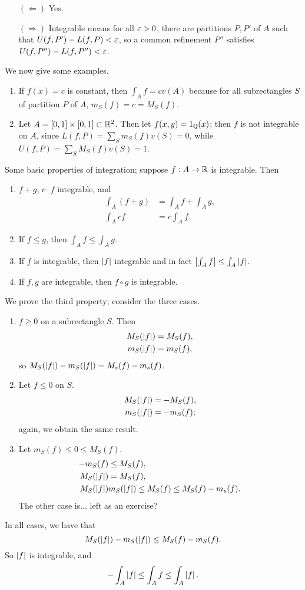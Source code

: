 \begin{itemize}
    \item[$(\Leftarrow)$] Yes.
    \item[$(\Rightarrow)$] Integrable means for all $\varepsilon > 0$, there are partitions $P, P'$ of $A$ such that $U(f, P') - L(f, P) < \varepsilon$, so a common refinement $P''$ satisfies $U(f, P'') - L(f, P'') < \varepsilon$.
\end{itemize}
We now give some examples.
\begin{enumerate}[label=(\alph*)]
    \item If $f(x) = c$ is constant, then $\int_A f = cv(A)$ because for all subrectangles $S$ of partition $P$ of $A$, $m_S(f) = c = M_S(f)$.
    \item Let $A = [0, 1] \times [0, 1] \subset \mathbb R^2$. Then let $f(x, y) = 1_\mathbb Q(x)$; then $f$ is not integrable on $A$, since $L(f, P) = \sum_S m_S(f) v(S) = 0$, while $U(f, P) = \sum_S M_S(f) v(S) = 1$.
\end{enumerate}
Some basic properties of integration; suppose $f : A \to \mathbb R$ is integrable. Then
\begin{enumerate}[label=(\roman*)]
    \item $f + g$, $c \cdot f$ integrable, and
    \begin{align*}
        \int_A (f + g) &= \int_A f + \int_A g, \\
        \int_A cf &= c \int_A f.
    \end{align*}
    \item If $f \leq g$, then $\int_A f \leq \int_A g$.
    \item If $f$ is integrable, then $\left\lvert f \right\rvert$ integrable and in fact $\left\lvert \int_A f \right\rvert \leq \int_A \left\lvert f \right\rvert$.
    \item If $f, g$ are integrable, then $f \circ g$ is integrable.
\end{enumerate}
We prove the third property; consider the three cases.
\begin{enumerate}[label=(\alph*)]
    \item $f \geq 0$ on a subrectangle $S$. Then
    \begin{align*}
        M_S(\left\lvert f \right\rvert) &= M_S(f), \\
        m_S(\left\lvert f \right\rvert) &= m_S(f),
    \end{align*}
    so $M_S(\left\lvert f \right\rvert) - m_S(\left\lvert f \right\rvert) = M_s(f) - m_s(f)$.
    \item Let $f \leq 0$ on $S$.
    \begin{align*}
        M_S(\left\lvert f \right\rvert) &= -M_S(f), \\
        m_S(\left\lvert f \right\rvert) &= -m_S(f);
    \end{align*}
    again, we obtain the same result.
    \item Let $m_S(f) \leq 0 \leq M_S(f)$.
    \begin{align*}
        -m_S(f) &\leq M_S(f), \\
        M_S(\left\lvert f \right\rvert) &= M_S(f), \\
        M_S(\left\lvert f \right\rvert) & m_S(\left\lvert f \right\rvert) \leq M_S(f) \leq M_S(f) - m_s(f).
    \end{align*}
    The other case is... left as an exercise?
\end{enumerate}
In all cases, we have that
\[ M_S(\left\lvert f \right\rvert) - m_S(\left\lvert f \right\rvert) \leq M_S(f) - m_S(f). \]
So $\left\lvert f \right\rvert$ is integrable, and
\[ -\int_A \left\lvert f \right\rvert \leq \int_A f \leq \int_A \left\lvert f \right\rvert. \] 